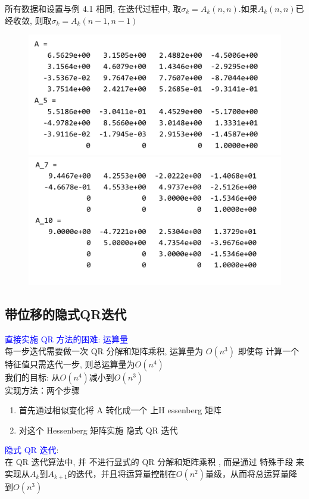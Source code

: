 \documentclass[12pt,a4paper]{article}
\begin{document}
	所有数据和设置与例 4.1 相同, 在迭代过程中, 取$\sigma_{k}=A_{k}(n, n)$.如果$A_{k}(n, n)$已经收敛, 则取$\sigma_{k}=A_{k}(n-1, n-1)$
	\begin{figure}
		\begin{center}
			\includegraphics[scale=0.6]{figure7.png}
			\includegraphics[scale=0.6]{figure8.png}
		\end{center}
	\end{figure}
	\subsection{带位移的隐式QR迭代}
	\noindent \textcolor{blue}{直接实施 QR 方法的困难: 运算量}\\
	每一步迭代需要做一次 QR 分解和矩阵乘积, 运算量为 $O\left(n^{3}\right)$ 即使每 计算一个特征值只需迭代一步, 则总运算量为$O\left(n^{4}\right)$\\
	我们的目标: 从$O\left(n^{4}\right)$减小到$O\left(n^{3}\right)$\\
	实现方法：两个步骤\\
	\begin{enumerate}[(1)]
		\item 首先通过相似变化将 A 转化成一个 上H
		essenberg 矩阵
		\item 对这个 Hessenberg 矩阵实施 隐式 QR 迭代
	\end{enumerate}
	\textcolor{blue}{隐式 QR 迭代}:\\
	在 QR 迭代算法中, 并 不进行显式的 QR 分解和矩阵乘积 , 而是通过 特殊手段 来实现从$A_{k}$到$A_{k+1}$的迭代，并且将运算量控制在$O\left(n^{2}\right)$量级，从而将总运算量降到$O(n^{3})$
\end{document}
